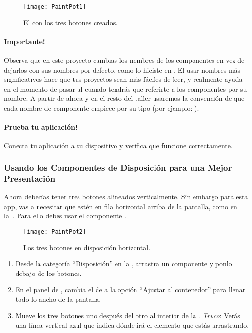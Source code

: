 \begin{figure}[H]
\vspace{3em}
\centering
\texttt{[image: PaintPot1]}
\caption{El \viewer con los tres botones creados.}
\label{fig:PaintPot1}
\end{figure}

\paragraph{Importante!}
Observa que en este proyecto cambias los nombres de los componentes en
vez de dejarlos con sus nombres por defecto, como lo hiciste en
. El usar nombres más significativos hace que tus
proyectos sean más fáciles de leer, y realmente ayuda en el momento de
pasar al \blockEditor cuando tendrás que referirte a los componentes
por su nombre. A partir de ahora y en el resto del taller usaremos la
convención de que cada nombre de componente empiece por su tipo (por
ejemplo: ).

\paragraph{Prueba tu aplicación!} Conecta tu aplicación a tu
dispositivo y verifica que funcione correctamente.

\subsubsection*{Usando los Componentes de Disposición para una Mejor
  Presentación}

Ahora deberías tener tres botones alineados verticalmente. Sin embargo
para esta app, vas a necesitar que estén en fila horizontal arriba de
la pantalla, como en la~. Para ello debes usar el
componente .

\begin{figure}[H]
\centering
\texttt{[image: PaintPot2]}
\caption{Los tres botones en disposición horizontal.}
\label{fig:PaintPot2}
\end{figure}

\begin{enumerate}

\item Desde la categoría “Disposición'' en la \palette, arrastra un
  componente  y ponlo debajo de los
  botones.

\item En el panel de \properties, cambia el  de
   a la opción ``Ajustar al
  contenedor'' para llenar todo lo ancho de la pantalla.

\item Mueve los tres botones uno después del otro al interior de la
  . \emph{Truco}: Verás una línea
  vertical azul que indica dónde irá el elemento que estás
  arrastrando.

\end{enumerate}

